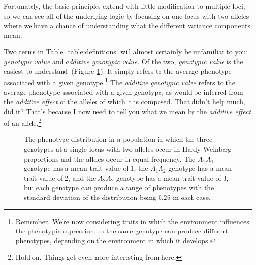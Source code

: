 \documentclass[12pt]{article}
\begin{document}
\noindent Fortunately, the basic principles extend with little
modification to multiple loci, so we can see all of the underlying
logic by focusing on one locus with two alleles where we have a chance
of understanding what the different variance components mean.

Two terms in Table~\ref{table:definitions} will almost certainly be
unfamiliar to you: {\it genotypic value\/} and {\it additive genotypic
  value}. Of the two, {\it genotypic value\/} is the easiest to
understand~(Figure~\ref{fig:genotypic-value}). It simply refers to the
average phenotype associated with a given
genotype.\footnote{Remember. We're now considering traits in which the
  environment influences the phenotypic expression, so the same
  genotype can produce different phenotypes, depending on the
  environment in which it develops.} The {\it additive genotypic
  value\/} refers to the average phenotype associated with a given
genotype, as would be inferred from the {\it additive effect\/} of the
alleles of which it is composed. That didn't help much, did it? That's
because I now need to tell you what we mean by the {\it additive
  effect\/} of an allele.\footnote{Hold on. Things get even more
  interesting from here.}

\begin{figure}
\begin{center}
\end{center}
\caption{The phenotype distribution in a population in which the three
  genotypes at a single locus with two alleles occur in Hardy-Weinberg
  proportions and the alleles occur in equal frequency. The $A_1A_1$
  genotype has a mean trait value of 1, the $A_1A_2$ genotype has a
  mean trait value of 2, and the $A_2A_2$ genotype has a mean trait
  value of 3, but each genotype can produce a range of phenotypes with
  the standard deviation of the distribution being 0.25 in each
  case.}\label{fig:genotypic-value}
\end{figure}
\end{document}

